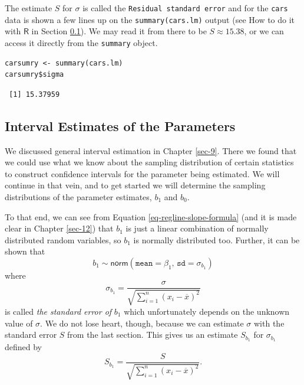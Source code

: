 \documentclass[captions=tableheading]{scrbook}
\begin{document}
The estimate \(S\) for \(\sigma\) is called the \texttt{Residual standard error} and for the \texttt{cars} data is shown a few lines up on the \texttt{summary(cars.lm)} output (see How to do it with \(\mathsf{R}\) in Section \ref{sec-11-2-4}). We may read it from there to be \( S\approx  15.38 \), or we can access it directly from the \texttt{summary} object.


\lstset{language=R}
\begin{lstlisting}
carsumry <- summary(cars.lm)
carsumry$sigma
\end{lstlisting}

\begin{verbatim}
 [1] 15.37959
\end{verbatim}
\subsection{Interval Estimates of the Parameters}
\label{sec-11-2-4}
\label{sub-slr-interval-est-params}


We discussed general interval estimation in Chapter \ref{sec-9}. There we found that we could use what we know about the sampling distribution of certain statistics to construct confidence intervals for the parameter being estimated. We will continue in that vein, and to get started we will determine the sampling distributions of the parameter estimates, \(b_{1}\) and \(b_{0}\).

To that end, we can see from Equation \ref{eq-regline-slope-formula} (and it is made clear in Chapter \ref{sec-12}) that \(b_{1}\) is just a linear combination of normally distributed random variables, so \(b_{1}\) is normally distributed too. Further, it can be shown that
\begin{equation}
b_{1}\sim\mathsf{norm}\left(\mathtt{mean}=\beta_{1},\,\mathtt{sd}=\sigma_{b_{1}}\right)
\end{equation}
where
\begin{equation}
\sigma_{b_{1}}=\frac{\sigma}{\sqrt{\sum_{i=1}^{n}(x_{i}-\overline{x})^{2}}}
\end{equation}
is called \emph{the standard error of} \(b_{1}\) which unfortunately depends on the unknown value of \(\sigma\). We do not lose heart, though, because we can estimate \(\sigma\) with the standard error \(S\) from the last section. This gives us an estimate \(S_{b_{1}}\) for \(\sigma_{b_{1}}\) defined by
\begin{equation}
S_{b_{1}}=\frac{S}{\sqrt{\sum_{i=1}^{n}(x_{i}-\overline{x})^{2}}}.
\end{equation}
\end{document}
